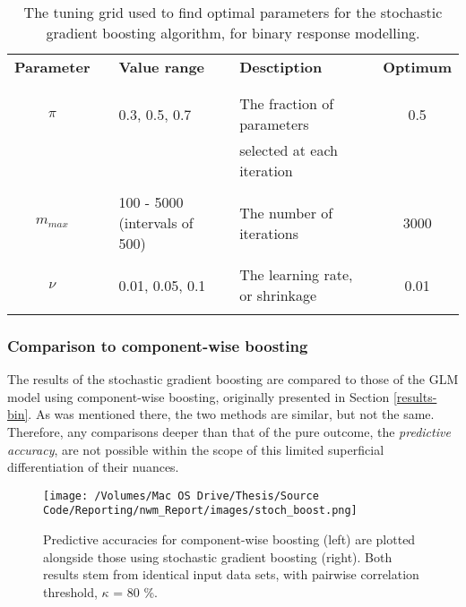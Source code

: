 \documentclass{article}
\begin{document}
\begin{table}[htb]
\centering
\begin{tabular}{clllllc}
\textbf{Parameter} &  & \textbf{Value range} &  & \textbf{Desctiption} &  & \textbf{Optimum}\\
 &  &  &  &  &  & \\
\hline
 &  &  &  &  &  & \\
$\pi$ &  & 0.3, 0.5, 0.7 &  & The fraction of parameters &  & 0.5\\
 &  &  &  & selected at each iteration &  & \\
 &  &  &  &  &  & \\
$m_{max}$ &  & 100 - 5000 (intervals of 500) &  & The number of iterations &  & 3000\\
 &  &  &  &  &  & \\
$\nu$ &  & 0.01, 0.05, 0.1 &  & The learning rate, or shrinkage &  & 0.01\\
 &  &  &  &  &  & \\
\end{tabular}\caption[The tuning grid optimised over for stochastic gradient boosting]{\label{tab:tuning-grid}The tuning grid used to find optimal parameters for the stochastic gradient boosting algorithm, for binary response modelling.}

\end{table}


\subsubsection{Comparison to component-wise boosting}
\label{sec-6-5-2}

The results of the stochastic gradient boosting are compared to those of the GLM model using component-wise boosting, originally presented in Section \ref{results-bin}. As was mentioned there, the two methods are similar, but not the same. Therefore, any comparisons deeper than that of the pure outcome, the \emph{predictive accuracy}, are not possible within the scope of this limited superficial differentiation of their nuances.

\begin{figure}[htb]
\centering
\texttt{[image: /Volumes/Mac OS Drive/Thesis/Source Code/Reporting/nwm\_Report/images/stoch\_boost.png]}
\caption[The predictive accuracies of \emph{component-wise} versus \emph{batch} stochastic gradient boosting]{\label{fig:stoch-pred-acc}Predictive accuracies for component-wise boosting (left) are plotted alongside those using stochastic gradient boosting (right). Both results stem from identical input data sets, with pairwise correlation threshold, $\kappa$ = 80 \%.}
\end{figure}
\end{document}
